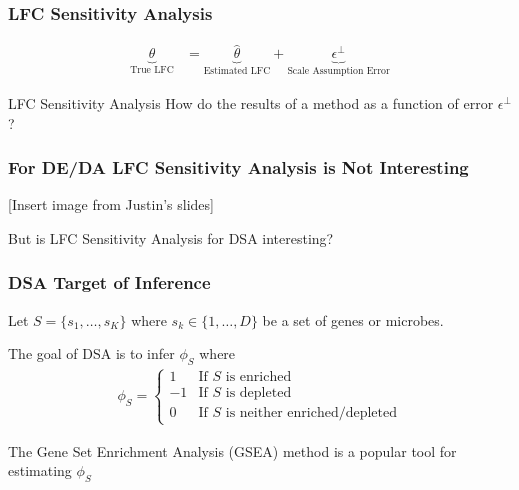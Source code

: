 \documentclass[11pt]{beamer}
\begin{document}
\begin{frame}
  \frametitle{LFC Sensitivity Analysis}

    \begin{align*}
      \underbrace{\theta}_{\text{True LFC}} &= \underbrace{\hat{\theta}}_{\text{Estimated LFC}} + \underbrace{\epsilon^\perp}_{\text{Scale Assumption Error}}
    \end{align*}

    \vspace{15px}
    \begin{center}
    \begin{block}{LFC Sensitivity Analysis}
      How do the results of a method as a function of error \(\epsilon^\perp\)?
    \end{block}  
    \end{center}
\end{frame}

\begin{frame}
  \frametitle{For DE/DA LFC Sensitivity Analysis is Not Interesting}

  [Insert image from Justin's slides]
\end{frame}

\begin{frame}
  \begin{center}
    But is LFC Sensitivity Analysis for DSA interesting?
  \end{center}
\end{frame}

\begin{frame}
  \frametitle{DSA Target of Inference}

  Let \(S=\{s_1,\dots,s_K\}\) where \(s_k \in  \{1,\dots,D\}\) be a set of genes or microbes.

  \vspace{15px}

  The goal of DSA is to infer \(\phi_S\) where
  \begin{align*}
    \phi_S = \begin{cases}
      1 & \text{If } S \text{ is enriched} \\
      -1 & \text{If } S \text{ is depleted} \\
      0 & \text{If } S \text{ is neither enriched/depleted}
    \end{cases}
  \end{align*}

  \vspace{15px}

  The Gene Set Enrichment Analysis (GSEA) method is a popular tool for estimating \(\phi_S\)
  
\end{frame}
\end{document}
